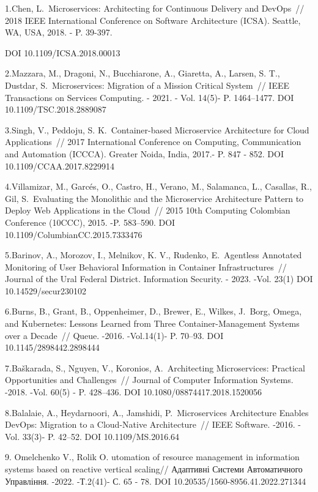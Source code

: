 \begin{references}
1.Chen, L.~Microservices: Architecting for Continuous Delivery and
DevOps~// 2018 IEEE International Conference on Software Architecture
(ICSA). Seattle, WA, USA, 2018. - P. 39-397.

DOI 10.1109/ICSA.2018.00013

2.Mazzara, M., Dragoni, N., Bucchiarone, A., Giaretta, A., Larsen, S.
T., Dustdar, S.~Microservices: Migration of a Mission Critical System~//
IEEE Transactions on Services Computing. - 2021. - Vol. 14(5)- P.
1464--1477. DOI 10.1109/TSC.2018.2889087

3.Singh, V., Peddoju, S. K.~Container-based Microservice Architecture
for Cloud Applications~// 2017 International Conference on Computing,
Communication and Automation (ICCCA). Greater Noida, India, 2017.- P.
847 - 852. DOI 10.1109/CCAA.2017.8229914

4.Villamizar, M., Garcés, O., Castro, H., Verano, M., Salamanca, L.,
Casallas, R., Gil, S.~Evaluating the Monolithic and the Microservice
Architecture Pattern to Deploy Web Applications in the Cloud~// 2015
10th Computing Colombian Conference (10CCC), 2015. -P. 583--590. DOI
10.1109/ColumbianCC.2015.7333476

5.Barinov, A., Morozov, I., Melnikov, K. V., Rudenko, E.~Agentless
Annotated Monitoring of User Behavioral Information in Container
Infrastructures~// Journal of the Ural Federal District. Information
Security. - 2023. -Vol. 23(1) DOI 10.14529/secur230102

6.Burns, B., Grant, B., Oppenheimer, D., Brewer, E., Wilkes, J.~Borg,
Omega, and Kubernetes: Lessons Learned from Three Container-Management
Systems over a Decade~// Queue. -2016. -Vol.14(1)- P. 70--93. DOI
10.1145/2898442.2898444

7.Baškarada, S., Nguyen, V., Koronios, A.~Architecting Microservices:
Practical Opportunities and Challenges~// Journal of Computer
Information Systems. -2018. -Vol. 60(5) - P. 428--436. DOI
10.1080/08874417.2018.1520056

8.Balalaie, A., Heydarnoori, A., Jamshidi, P.~Microservices Architecture
Enables DevOps: Migration to a Cloud-Native Architecture~// IEEE
Software. -2016. -Vol. 33(3)- P. 42--52. DOI 10.1109/MS.2016.64

9. Omelchenko V., Rolik O. utomation of resource management in
information systems based on reactive vertical scaling// Адаптивні
Системи Автоматичного Управління. -2022. -Т.2(41)- С. 65 - 78. DOI
10.20535/1560-8956.41.2022.271344


\end{references}
